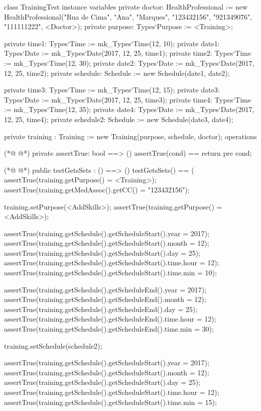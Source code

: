 \begin{vdmpp}[breaklines=true]
class TrainingTest
instance variables
 private doctor: HealthProfessional := new HealthProfessional("Rua de Cima", "Ana", "Marques", "123432156", "921349076", "111111222", <Doctor>);
  private purpose: Types`Purpose := <Training>;
  
 private time1: Types`Time := mk_Types`Time(12, 10);
 private date1: Types`Date := mk_Types`Date(2017, 12, 25, time1);
 private time2: Types`Time := mk_Types`Time(12, 30);
 private date2: Types`Date := mk_Types`Date(2017, 12, 25, time2);
 private schedule: Schedule := new Schedule(date1, date2);
 
 private time3: Types`Time := mk_Types`Time(12, 15);
 private date3: Types`Date := mk_Types`Date(2017, 12, 25, time3);
 private time4: Types`Time := mk_Types`Time(12, 35);
 private date4: Types`Date := mk_Types`Date(2017, 12, 25, time4);
 private schedule2: Schedule := new Schedule(date3, date4);
 
 private training : Training := new Training(purpose, schedule, doctor);
operations
 
(*@
\label{assertTrue:21}
@*)
 private assertTrue: bool ==> ()
  assertTrue(cond) == return
 pre cond;
 
(*@
\label{testGetsSets:25}
@*)
 public testGetsSets : () ==> ()
  testGetsSets() == (
   assertTrue(training.getPurpose() = <Training>);
   assertTrue(training.getMedAssoc().getCC() = "123432156");
   
   training.setPurpose(<AddSkills>);
   assertTrue(training.getPurpose() = <AddSkills>);
   
   assertTrue(training.getSchedule().getScheduleStart().year = 2017);
   assertTrue(training.getSchedule().getScheduleStart().month = 12);
   assertTrue(training.getSchedule().getScheduleStart().day = 25);
   assertTrue(training.getSchedule().getScheduleStart().time.hour = 12);
   assertTrue(training.getSchedule().getScheduleStart().time.min = 10);
   
   assertTrue(training.getSchedule().getScheduleEnd().year = 2017);
   assertTrue(training.getSchedule().getScheduleEnd().month = 12);
   assertTrue(training.getSchedule().getScheduleEnd().day = 25);
   assertTrue(training.getSchedule().getScheduleEnd().time.hour = 12);
   assertTrue(training.getSchedule().getScheduleEnd().time.min = 30);
   
   training.setSchedule(schedule2);
   
   assertTrue(training.getSchedule().getScheduleStart().year = 2017);
   assertTrue(training.getSchedule().getScheduleStart().month = 12);
   assertTrue(training.getSchedule().getScheduleStart().day = 25);
   assertTrue(training.getSchedule().getScheduleStart().time.hour = 12);
   assertTrue(training.getSchedule().getScheduleStart().time.min = 15);
   

\end{vdmpp}
